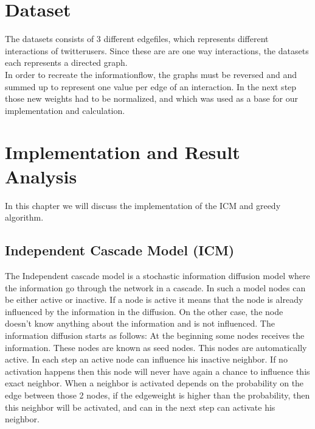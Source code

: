 

\section{Dataset}
The datasets consists of 3 different edgefiles, which represents different interactions of twitterusers. Since these are are one way interactions, the datasets each represents a directed graph.\\
 In order to recreate the informationflow, the graphs must be reversed and and summed up to represent one value per edge of an interaction. In the next step those new weights had to be normalized, and which was used as a base for our implementation and calculation.
\section{Implementation and Result Analysis}
In this chapter we will discuss the implementation of the ICM and greedy algorithm.
\subsection{Independent Cascade Model (ICM)}
The Independent cascade model is a stochastic information diffusion model where the information go through the network in a cascade. In such a model nodes can be either active or inactive. If a node is active it means that the node is already influenced by the information in the diffusion. On the other case, the node doesn't know anything about the information and is not influenced.
The information diffusion starts as follows: At the beginning some nodes receives the information. These nodes are known as seed nodes. This nodes are automatically active. In each step an active node can influence his inactive neighbor. If no activation happens then this node will never have again a chance to influence this exact neighbor. When a neighbor is activated depends on the probability on the edge between those 2 nodes, if the edgeweight is higher than the probability, then this neighbor will be activated, and can in the next step can activate his neighbor.

